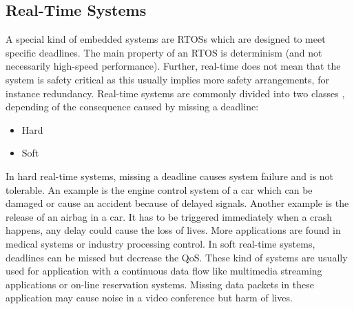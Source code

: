 \subsection{Real-Time Systems}
A special kind of embedded systems are \acp{RTOS} which are designed to meet specific deadlines. 
The main property of an \ac{RTOS} is determinism (and not necessarily high-speed performance).  
Further, real-time does not mean that the system is safety critical as this usually implies more safety arrangements, for instance redundancy.
Real-time systems are commonly divided into two classes \cite{stromblad:elfrtoemd}, depending of the consequence caused by missing a deadline:
\begin{itemize}
	\item Hard
	\item Soft
\end{itemize}
In hard real-time systems, missing a deadline causes system failure and is not tolerable.  
An example is the engine control system of a car which can be damaged or cause an accident because of delayed signals.
Another example is the release of an airbag in a car. 
It has to be triggered immediately when a crash happens, any delay could cause the loss of lives. 
More applications are found in medical systems or industry processing control.  
In soft real-time systems, deadlines can be missed but decrease the \ac{QoS}. 
These kind of systems are usually used for application with a continuous data flow like multimedia streaming applications or on-line reservation systems.
Missing data packets in these application may cause noise in a video conference but harm of lives.


